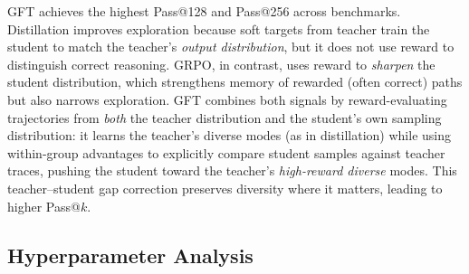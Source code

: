 GFT achieves the highest Pass@128 and Pass@256 across benchmarks. Distillation improves exploration because soft targets from teacher train the student to match the teacher’s \emph{output distribution}, but it does not use reward to distinguish correct reasoning. GRPO, in contrast, uses reward to \emph{sharpen} the student distribution, which strengthens memory of rewarded (often correct) paths but also narrows exploration. GFT combines both signals by reward-evaluating trajectories from \emph{both} the teacher distribution and the student’s own sampling distribution: it learns the teacher’s diverse modes (as in distillation) while using within-group advantages to explicitly compare student samples against teacher traces, pushing the student toward the teacher’s \emph{high-reward diverse} modes. This teacher--student gap correction preserves diversity where it matters, leading to higher Pass@$k$.



\subsection{Hyperparameter Analysis}
\label{sec:hyperparameter}



